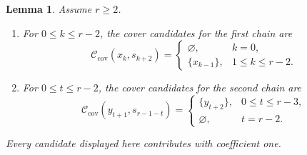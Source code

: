 \documentclass[11pt,a4paper,reqno]{amsart}
\numberwithin{equation}{section}
\newtheorem{lemma}[theorem]{Lemma}
\theoremstyle{definition}
\theoremstyle{remark}
\theoremstyle{plain}
\begin{document}
\begin{lemma}\label{lem:covers}
Assume $r\geq2$.
\begin{enumerate}[label=\textup{(\roman*)}]
\item For $0\leq k\leq r-2$, the cover candidates for the first
chain are
\[
 \mathcal C_{\mathrm{cov}}(x_k,s_{k+2})=
 \begin{cases}
  \varnothing,&k=0,\\
  \{x_{k-1}\},&1\leq k\leq r-2.
 \end{cases}
\]
\item For $0\leq t\leq r-2$, the cover candidates for the second
chain are
\[
 \mathcal C_{\mathrm{cov}}(y_{t+1},s_{r-1-t})=
 \begin{cases}
  \{y_{t+2}\},&0\leq t\leq r-3,\\
  \varnothing,&t=r-2.
 \end{cases}
\]
\end{enumerate}
Every candidate displayed here contributes with coefficient one.
\end{lemma}
\end{document}

